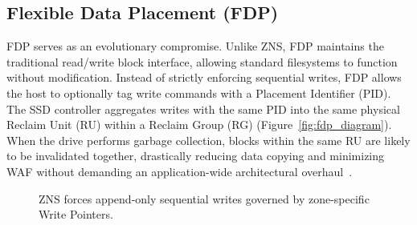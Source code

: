 \documentclass[letterpaper,twocolumn,10pt]{article}
\begin{document}
\subsection{Flexible Data Placement (FDP)}
FDP serves as an evolutionary compromise. Unlike ZNS, FDP maintains the traditional read/write block interface, allowing standard filesystems to function without modification. Instead of strictly enforcing sequential writes, FDP allows the host to optionally tag write commands with a Placement Identifier (PID). The SSD controller aggregates writes with the same PID into the same physical Reclaim Unit (RU) within a Reclaim Group (RG) (Figure~\ref{fig:fdp_diagram}). When the drive performs garbage collection, blocks within the same RU are likely to be invalidated together, drastically reducing data copying and minimizing WAF without demanding an application-wide architectural overhaul~\cite{park2025fdpvirt}.

\begin{figure}[t]
\begin{center}
\end{center}
\vspace{-0.5cm}
\caption{\label{fig:zns_diagram} ZNS forces append-only sequential writes governed by zone-specific Write Pointers.}
\end{figure}
\end{document}
